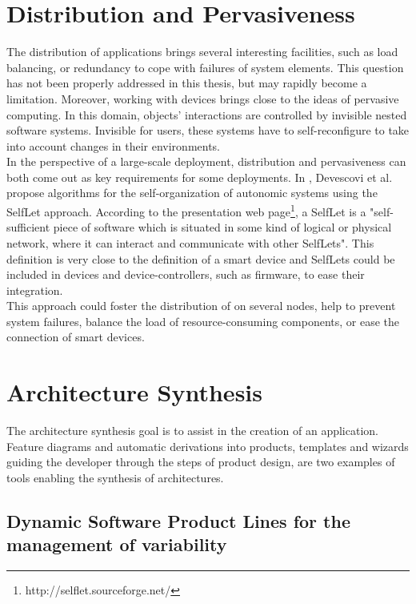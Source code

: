 \section{Distribution and Pervasiveness}

The distribution of applications brings several interesting facilities, such as load balancing, or redundancy to cope with failures of system elements. This question has not been properly addressed in this thesis, but may rapidly become a limitation. Moreover, working with devices brings \enti{} close to the ideas of pervasive computing. In this domain, objects' interactions are controlled by invisible nested software systems. Invisible for users, these systems have to self-reconfigure to take into account changes in their environments.\\

In the perspective of a large-scale deployment, distribution and pervasiveness can both come out as key requirements for some deployments. In \cite{Devescovi:2007}, Devescovi et al. propose algorithms for the self-organization of autonomic systems using the SelfLet approach. According to the presentation web page\footnote{http://selflet.sourceforge.net/}, a SelfLet is a "self-sufficient piece of software which is situated in some kind of logical or physical network, where it can interact and communicate with other SelfLets". This definition is very close to the definition of a smart device and SelfLets could be included in devices and device-controllers, such as firmware, to ease their integration.\\
This approach could foster the distribution of \enti{} on several nodes, help to prevent system failures, balance the load of resource-consuming components, or ease the connection of smart devices.


\section{Architecture Synthesis}
\label{sec:archiSynth}

The architecture synthesis goal is to assist in the creation of an application. Feature diagrams and automatic derivations into products, templates and wizards guiding the developer through the steps of product design, are two examples of tools enabling the synthesis of architectures.

\subsection{Dynamic Software Product Lines for the management of variability}

